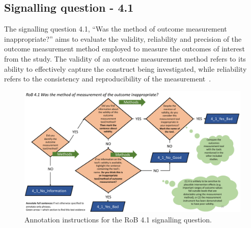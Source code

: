 \documentclass[sn-mathphys,Numbered]{sn-jnl}%
\begin{document}
\subsection*{Signalling question - 4.1 }
\label{subsec:4_1}
%
The signalling question 4.1, ``Was the method of outcome measurement inappropriate?'' aims to evaluate the validity, reliability and precision of the outcome measurement method employed to measure the outcomes of interest from the study.
The validity of an outcome measurement method refers to its ability to effectively capture the construct being investigated, while reliability refers to the consistency and reproducibility of the measurement~\cite{williamson2012developing,grill2019mci,rubin2014systematic}.

%
%
%
\begin{figure}[hbt]
    \centering
    \includegraphics[width=\textwidth]{figures/4_1.pdf}
    \caption{Annotation instructions for the RoB 4.1 signalling question.}
    \label{fig:4_1}
\end{figure}
%
%
%
\end{document}

